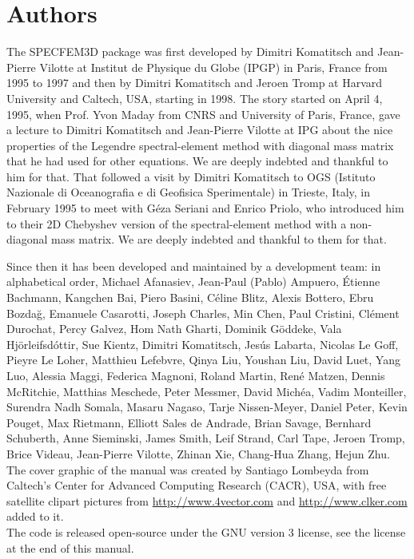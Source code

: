 \section*{Authors}

\noindent The SPECFEM3D package was first developed by Dimitri
Komatitsch and Jean-Pierre Vilotte at Institut de Physique du Globe
(IPGP) in Paris, France from 1995 to 1997 and then by Dimitri Komatitsch
and Jeroen Tromp at Harvard University and Caltech, USA, starting in 1998.
The story started on April 4, 1995, when Prof. Yvon Maday from CNRS and University of Paris, France, gave a lecture to
Dimitri Komatitsch and Jean-Pierre Vilotte at IPG about the nice properties of the Legendre spectral-element method with diagonal mass matrix that he had used for
other equations. We are deeply indebted and thankful to him for that.
That followed a visit by Dimitri Komatitsch to OGS (Istituto Nazionale di Oceanografia e di Geofisica Sperimentale) in Trieste, Italy, in February 1995
to meet with G\'eza Seriani and Enrico Priolo, who introduced him to their 2D Chebyshev version of the spectral-element method with a non-diagonal mass matrix.
We are deeply indebted and thankful to them for that.

Since then it has been developed and maintained by a development team: in alphabetical order,
Michael Afanasiev,
Jean-Paul (Pablo) Ampuero,
\'Etienne Bachmann,
Kangchen Bai,
Piero Basini,
C\'eline Blitz,
Alexis Bottero,
Ebru Bozda\u{g},
Emanuele Casarotti,
Joseph Charles,
Min Chen,
Paul Cristini,
Cl\'ement Durochat,
Percy Galvez,
Hom Nath Gharti,
Dominik G\"oddeke,
Vala Hj\"orleifsd\'ottir,
Sue Kientz,
Dimitri Komatitsch,
Jes\'us Labarta,
Nicolas Le Goff,
Pieyre Le Loher,
Matthieu Lefebvre,
Qinya Liu,
Youshan Liu,
David Luet,
Yang Luo,
Alessia Maggi,
Federica Magnoni,
Roland Martin,
Ren\'e Matzen,
Dennis McRitchie,
Matthias Meschede,
Peter Messmer,
David Mich\'ea,
Vadim Monteiller,
Surendra Nadh Somala,
Masaru Nagaso,
Tarje Nissen-Meyer,
Daniel Peter,
Kevin Pouget,
Max Rietmann,
Elliott Sales de Andrade,
Brian Savage,
Bernhard Schuberth,
Anne Sieminski,
James Smith,
Leif Strand,
Carl Tape,
Jeroen Tromp,
Brice Videau,
Jean-Pierre Vilotte,
Zhinan Xie,
Chang-Hua Zhang,
Hejun Zhu.\\

The cover graphic of the manual was created by Santiago Lombeyda from
Caltech's Center for Advanced Computing Research (CACR), USA, with free satellite clipart pictures
from \url{http://www.4vector.com} and \url{http://www.clker.com} added to it.\\

The code is released open-source under the GNU version 3 license, see the license at the end of this manual.\\

